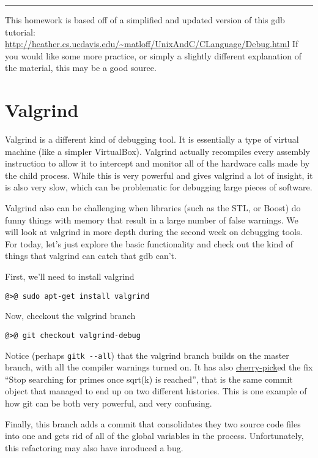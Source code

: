 \documentclass{article}
\begin{document}
\vfill
\hrule
{\footnotesize
This homework is based off of a simplified and updated version of this gdb
tutorial:
\url{http://heather.cs.ucdavis.edu/~matloff/UnixAndC/CLanguage/Debug.html}
If you would like some more practice, or simply a slightly different
explanation of the material, this may be a good source.
}


\newpage
\section{Valgrind}

Valgrind is a different kind of debugging tool. It is essentially a type of
virtual machine (like a simpler VirtualBox). Valgrind actually recompiles
every assembly instruction to allow it to intercept and monitor all of the
hardware calls made by the child process. While this is very powerful and
gives valgrind a lot of insight, it is also very slow, which can be
problematic for debugging large pieces of software.

Valgrind also can be challenging when libraries (such as the STL, or Boost) do
funny things with memory that result in a large number of false warnings. We
will look at valgrind in more depth during the second week on debugging
tools. For today, let's just explore the basic functionality and check out the
kind of things that valgrind can catch that gdb can't.

First, we'll need to install valgrind
\begin{lstlisting}
@>@ sudo apt-get install valgrind
\end{lstlisting}

Now, checkout the valgrind branch
\begin{lstlisting}
@>@ git checkout valgrind-debug
\end{lstlisting}

Notice (perhaps \texttt{gitk~-{}-all}) that the valgrind branch builds on the
master branch, with all the compiler warnings turned on. It has also
\ul{cherry-pick}ed the fix ``Stop searching for primes once sqrt(k) is
reached'', that is the same commit object that managed to end up on two
different histories.  This is one example of how git can be both very
powerful, and very confusing.

Finally, this branch adds a commit that consolidates they two source code
files into one and gets rid of all of the global variables in the process.
Unfortunately, this refactoring may also have inroduced a bug.
\end{document}
